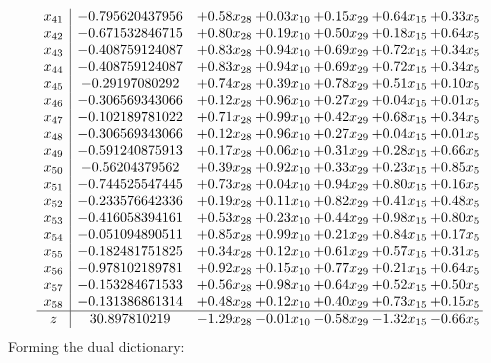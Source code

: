 \documentclass[8pt]{article}
\begin{document}
\[\begin{array}{c| c c@{\hskip 2pt} c@{\hskip 2pt} c@{\hskip 2pt} c@{\hskip 2pt} c@{\hskip 2pt} }
 x_{41}   &  -0.795620437956 & +  0.58 x_{28} & +  0.03 x_{10} & +  0.15 x_{29} & +  0.64 x_{15} & +  0.33 x_{5}\\
 x_{42}   &  -0.671532846715 & +  0.80 x_{28} & +  0.19 x_{10} & +  0.50 x_{29} & +  0.18 x_{15} & +  0.64 x_{5}\\
 x_{43}   &  -0.408759124087 & +  0.83 x_{28} & +  0.94 x_{10} & +  0.69 x_{29} & +  0.72 x_{15} & +  0.34 x_{5}\\
 x_{44}   &  -0.408759124087 & +  0.83 x_{28} & +  0.94 x_{10} & +  0.69 x_{29} & +  0.72 x_{15} & +  0.34 x_{5}\\
 x_{45}   &  -0.29197080292 & +  0.74 x_{28} & +  0.39 x_{10} & +  0.78 x_{29} & +  0.51 x_{15} & +  0.10 x_{5}\\
 x_{46}   &  -0.306569343066 & +  0.12 x_{28} & +  0.96 x_{10} & +  0.27 x_{29} & +  0.04 x_{15} & +  0.01 x_{5}\\
 x_{47}   &  -0.102189781022 & +  0.71 x_{28} & +  0.99 x_{10} & +  0.42 x_{29} & +  0.68 x_{15} & +  0.34 x_{5}\\
 x_{48}   &  -0.306569343066 & +  0.12 x_{28} & +  0.96 x_{10} & +  0.27 x_{29} & +  0.04 x_{15} & +  0.01 x_{5}\\
 x_{49}   &  -0.591240875913 & +  0.17 x_{28} & +  0.06 x_{10} & +  0.31 x_{29} & +  0.28 x_{15} & +  0.66 x_{5}\\
 x_{50}   &  -0.56204379562 & +  0.39 x_{28} & +  0.92 x_{10} & +  0.33 x_{29} & +  0.23 x_{15} & +  0.85 x_{5}\\
 x_{51}   &  -0.744525547445 & +  0.73 x_{28} & +  0.04 x_{10} & +  0.94 x_{29} & +  0.80 x_{15} & +  0.16 x_{5}\\
 x_{52}   &  -0.233576642336 & +  0.19 x_{28} & +  0.11 x_{10} & +  0.82 x_{29} & +  0.41 x_{15} & +  0.48 x_{5}\\
 x_{53}   &  -0.416058394161 & +  0.53 x_{28} & +  0.23 x_{10} & +  0.44 x_{29} & +  0.98 x_{15} & +  0.80 x_{5}\\
 x_{54}   &  -0.051094890511 & +  0.85 x_{28} & +  0.99 x_{10} & +  0.21 x_{29} & +  0.84 x_{15} & +  0.17 x_{5}\\
 x_{55}   &  -0.182481751825 & +  0.34 x_{28} & +  0.12 x_{10} & +  0.61 x_{29} & +  0.57 x_{15} & +  0.31 x_{5}\\
 x_{56}   &  -0.978102189781 & +  0.92 x_{28} & +  0.15 x_{10} & +  0.77 x_{29} & +  0.21 x_{15} & +  0.64 x_{5}\\
 x_{57}   &  -0.153284671533 & +  0.56 x_{28} & +  0.98 x_{10} & +  0.64 x_{29} & +  0.52 x_{15} & +  0.50 x_{5}\\
 x_{58}   &  -0.131386861314 & +  0.48 x_{28} & +  0.12 x_{10} & +  0.40 x_{29} & +  0.73 x_{15} & +  0.15 x_{5}\\
\hline
z    &  30.897810219 & -1.29 x_{28} & -0.01 x_{10} & -0.58 x_{29} & -1.32 x_{15} & -0.66 x_{5}\\
\end{array}\]
Forming the dual dictionary:
\end{document}
